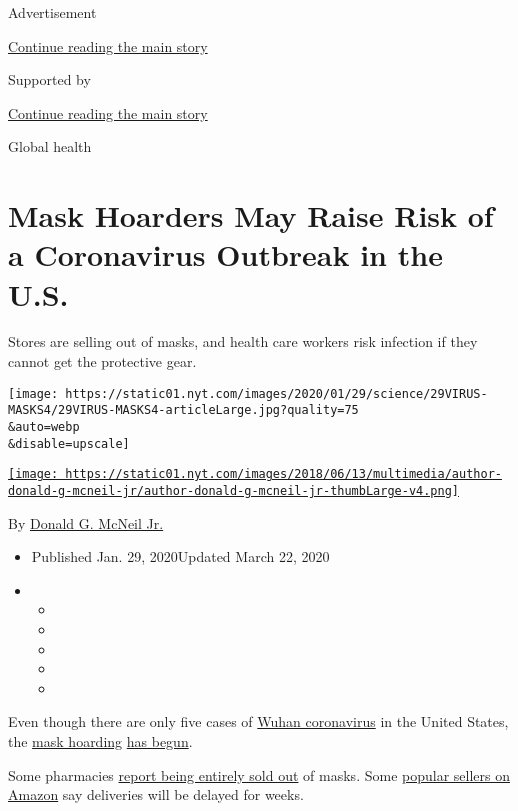 Advertisement

\protect\hyperlink{after-top}{Continue reading the main story}

Supported by

\protect\hyperlink{after-sponsor}{Continue reading the main story}

Global health

\hypertarget{mask-hoarders-may-raise-risk-of-a-coronavirus-outbreak-in-the-us}{%
\section{Mask Hoarders May Raise Risk of a Coronavirus Outbreak in the
U.S.}\label{mask-hoarders-may-raise-risk-of-a-coronavirus-outbreak-in-the-us}}

Stores are selling out of masks, and health care workers risk infection
if they cannot get the protective gear.

\texttt{[image: https://static01.nyt.com/images/2020/01/29/science/29VIRUS-MASKS4/29VIRUS-MASKS4-articleLarge.jpg?quality=75\\\&auto=webp\\\&disable=upscale]}

\href{https://www.nytimes.com/by/donald-g-mcneil-jr}{\texttt{[image: https://static01.nyt.com/images/2018/06/13/multimedia/author-donald-g-mcneil-jr/author-donald-g-mcneil-jr-thumbLarge-v4.png]}}

By \href{https://www.nytimes.com/by/donald-g-mcneil-jr}{Donald G. McNeil
Jr.}

\begin{itemize}
\item
  Published Jan. 29, 2020Updated March 22, 2020
\item
  \begin{itemize}
  \item
  \item
  \item
  \item
  \item
  \end{itemize}
\end{itemize}

Even though there are only five cases of
\href{https://www.nytimes.com/2020/01/30/podcasts/the-daily/coronavirus.html}{Wuhan
coronavirus} in the United States, the
\href{https://www.cnn.com/2020/01/28/health/coronavirus-us-masks-prevention-trnd/index.html}{mask
hoarding}
\href{https://finance.yahoo.com/news/china-virus-outbreak-triggers-global-082240405.html}{has
begun}.

Some pharmacies
\href{https://gothamist.com/news/chinese-new-yorkers-worried-about-coronavirus-are-wearing-masks-do-they-work}{report
being entirely sold out} of masks. Some
\href{https://www.businessinsider.com/amazon-sold-out-sellers-warn-counterfeit-masks-coronavirus-2020-1}{popular
sellers on Amazon} say deliveries will be delayed for weeks.

